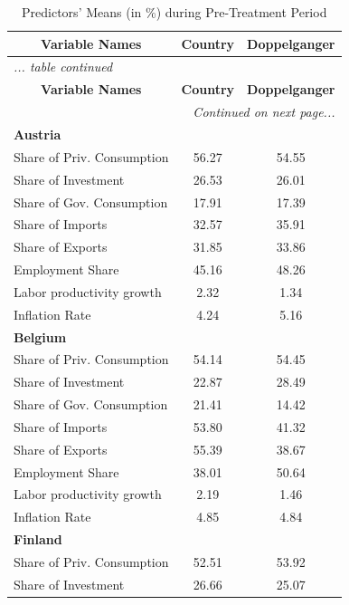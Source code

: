 \documentclass[12pt]{article}
\begin{document}
\begin{appendices}
\begin{center}
\footnotesize
\begin{longtable}{lcc}
\caption{\label{TA_comp} Predictors' Means (in \%) during Pre-Treatment Period}\\
\hline  
\hline  
 \multicolumn{1}{c}{\textbf{Variable Names}}   & \textbf{Country}  & \textbf{Doppelganger}  \\
\hline 
 \endfirsthead
\multicolumn{3}{l}{\emph{... table \thetable{} continued}} \\
\hline \hline 
 \multicolumn{1}{c}{\textbf{Variable Names}}   & \textbf{Country}  & \textbf{Doppelganger}  \\
\hline
\endhead
\hline
\multicolumn{3}{r}{\emph{Continued on next page...}}\\
\endfoot
\endlastfoot
\textbf{Austria} &  &  \\  
Share of Priv. Consumption &     56.27 &     54.55 \\  
Share of Investment &     26.53 &     26.01 \\  
Share of Gov. Consumption &     17.91 &     17.39 \\  
Share of Imports &     32.57 &     35.91 \\  
Share of Exports &     31.85 &     33.86 \\  
Employment Share &     45.16 &     48.26 \\  
Labor productivity growth &      2.32 &      1.34 \\  
Inflation Rate &      4.24 &      5.16 \\    \hline
\textbf{Belgium} &  &  \\  
Share of Priv. Consumption &     54.14 &     54.45 \\  
Share of Investment &     22.87 &     28.49 \\  
Share of Gov. Consumption &     21.41 &     14.42 \\  
Share of Imports &     53.80 &     41.32 \\  
Share of Exports &     55.39 &     38.67 \\  
Employment Share &     38.01 &     50.64 \\  
Labor productivity growth &      2.19 &      1.46 \\  
Inflation Rate &      4.85 &      4.84 \\  \hline
\textbf{Finland} &  &  \\  
Share of Priv. Consumption &     52.51 &     53.92 \\  
Share of Investment &     26.66 &     25.07 \\  

\end{longtable}
\end{center}
\end{appendices}
\end{document}
